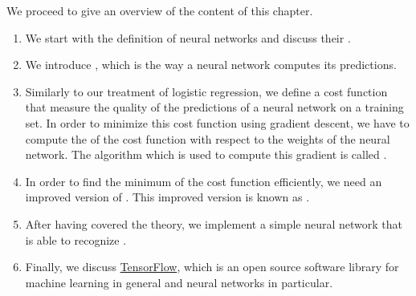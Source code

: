 We proceed to give an overview of the content of this chapter.
\begin{enumerate}
\item We start with the definition of  neural networks and discuss their .
\item We introduce , which is the way a neural network computes its predictions.
\item Similarly to our treatment of logistic regression, we define a cost function that measure the quality of
      the predictions of a neural network on a training set.  In order to minimize this cost function using
      gradient descent, we have to compute the  of the cost function with respect to the weights of the
      neural network.  The algorithm which is used to compute this gradient is called .
\item In order to find the minimum of the cost function efficiently, we need an improved version of
      .  This improved version is known as .
\item After having covered the theory, we implement a simple neural network that is able to recognize
      .
\item Finally, we discuss \href{https://www.tensorflow.org}{TensorFlow}, which is an open source software
      library for machine learning in general and neural networks in particular.
\end{enumerate}

